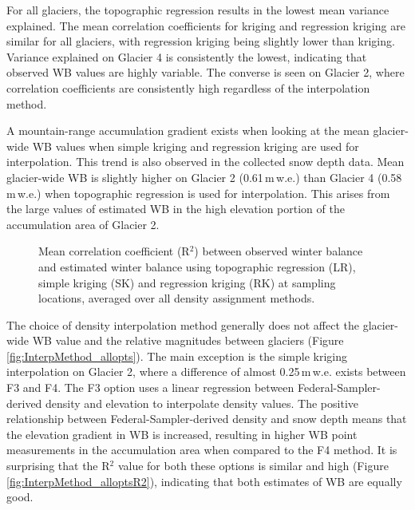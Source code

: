 \documentclass{sfuthesis}
\begin{document}
For all glaciers, the topographic regression results in the lowest mean variance explained. The mean correlation coefficients for kriging and regression kriging are similar for all glaciers, with regression kriging being slightly lower than kriging. Variance explained on Glacier 4 is consistently the lowest, indicating that observed WB values are highly variable. The converse is seen on Glacier 2, where correlation coefficients are consistently high regardless of the interpolation method.

A mountain-range accumulation gradient exists when looking at the mean glacier-wide WB values when simple kriging and regression kriging are used for interpolation. This trend is also observed in the collected snow depth data. Mean glacier-wide WB is slightly higher on Glacier 2 (0.61\,m\,w.e.) than Glacier 4 (0.58\,m\,w.e.) when topographic regression is used for interpolation. This arises from the large values of estimated WB in the high elevation portion of the accumulation area of Glacier 2.

\begin{figure}[H]
	\caption{Mean correlation coefficient (R$^2$) between observed winter balance and estimated winter balance using topographic regression (LR), simple kriging (SK) and regression kriging (RK) at sampling locations, averaged over all density assignment methods.}
	\label{fig:InterpMethod_meanR2}
\end{figure}

The choice of density interpolation method generally does not affect the glacier-wide WB value and the relative magnitudes between glaciers (Figure \ref{fig:InterpMethod_allopts}). The main exception is the simple kriging interpolation on Glacier 2, where a difference of almost 0.25\,m\,w.e. exists between F3 and F4. The F3 option uses a linear regression between Federal-Sampler-derived density and elevation to interpolate density values. The positive relationship between Federal-Sampler-derived density and snow depth means that the elevation gradient in WB is increased, resulting in higher WB point measurements in the accumulation area when compared to the F4 method.  It is surprising that the R$^2$ value for both these options is similar and high (Figure \ref{fig:InterpMethod_alloptsR2}), indicating that both estimates of WB are equally good.
\end{document}
